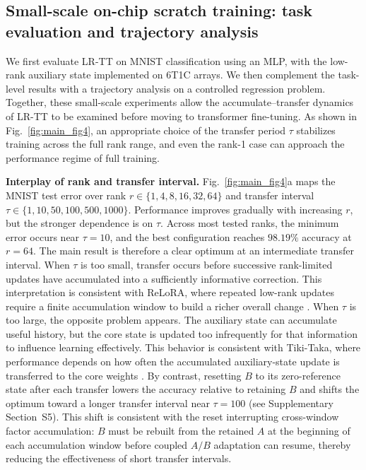 \documentclass[fleqn,10pt]{wlscirep}
\begin{document}
\subsection{\texorpdfstring{Small-scale on-chip scratch training: task evaluation and trajectory analysis}{Small-scale on-chip scratch training: task evaluation and trajectory analysis}}
\label{subsec:results_scratch}

\noindent
We first evaluate LR-TT on MNIST classification \cite{lecun1998gradient} using an MLP, with the low-rank auxiliary state implemented on 6T1C arrays. We then complement the task-level results with a trajectory analysis on a controlled regression problem. Together, these small-scale experiments allow the accumulate--transfer dynamics of LR-TT to be examined before moving to transformer fine-tuning. As shown in Fig.~\ref{fig:main_fig4}, an appropriate choice of the transfer period $\tau$ stabilizes training across the full rank range, and even the rank-1 case can approach the performance regime of full training.

\noindent\textbf{Interplay of rank and transfer interval.}
Fig.~\ref{fig:main_fig4}a maps the MNIST test error over rank $r\in\{1,4,8,16,32,64\}$ and transfer interval $\tau\in\{1,10,50,100,500,1000\}$. Performance improves gradually with increasing $r$, but the stronger dependence is on $\tau$. Across most tested ranks, the minimum error occurs near $\tau=10$, and the best configuration reaches \(98.19\%\) accuracy at \(r=64\). The main result is therefore a clear optimum at an intermediate transfer interval. When $\tau$ is too small, transfer occurs before successive rank-limited updates have accumulated into a sufficiently informative correction. This interpretation is consistent with ReLoRA, where repeated low-rank updates require a finite accumulation window to build a richer overall change \cite{lialin2023relora}. When $\tau$ is too large, the opposite problem appears. The auxiliary state can accumulate useful history, but the core state is updated too infrequently for that information to influence learning effectively. This behavior is consistent with Tiki-Taka, where performance depends on how often the accumulated auxiliary-state update is transferred to the core weights \cite{gokmen2020tikitaka,lee2022tikitaka_asymmetry,rasch2024fastrobust}. By contrast, resetting \(B\) to its zero-reference state after each transfer lowers the accuracy relative to retaining \(B\) and shifts the optimum toward a longer transfer interval near \(\tau=100\) (see Supplementary Section~S5). This shift is consistent with the reset interrupting cross-window factor accumulation: \(B\) must be rebuilt from the retained \(A\) at the beginning of each accumulation window before coupled \(A/B\) adaptation can resume, thereby reducing the effectiveness of short transfer intervals.
\end{document}
